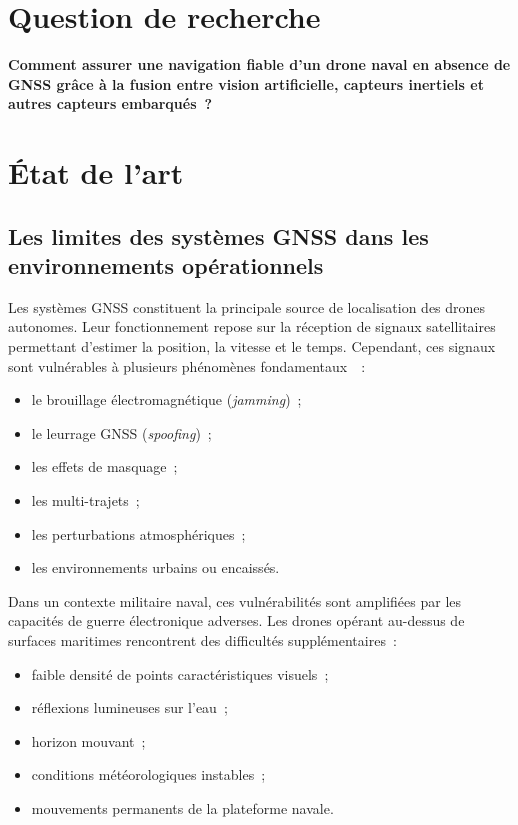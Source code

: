 \documentclass[12pt, a4paper, twoside, openright]{report}
\begin{document}
\section{Question de recherche}

\begin{mdframed}[backgroundcolor=blue!5, linewidth=1.5pt, linecolor=blue]
\textbf{Comment assurer une navigation fiable d'un drone naval en absence de GNSS grâce à la fusion entre vision artificielle, capteurs inertiels et autres capteurs embarqués~?}
\end{mdframed}

\section{État de l'art}

\subsection{Les limites des systèmes GNSS dans les environnements opérationnels}

Les systèmes GNSS constituent la principale source de localisation des drones autonomes. Leur fonctionnement repose sur la réception de signaux satellitaires permettant d'estimer la position, la vitesse et le temps. Cependant, ces signaux sont vulnérables à plusieurs phénomènes fondamentaux~\cite{mostafa2016gnss}~:

\begin{itemize}
    \item le brouillage électromagnétique (\textit{jamming})~;
    \item le leurrage GNSS (\textit{spoofing})~;
    \item les effets de masquage~;
    \item les multi-trajets~;
    \item les perturbations atmosphériques~;
    \item les environnements urbains ou encaissés.
\end{itemize}

Dans un contexte militaire naval, ces vulnérabilités sont amplifiées par les capacités de guerre électronique adverses. Les drones opérant au-dessus de surfaces maritimes rencontrent des difficultés supplémentaires~:

\begin{itemize}
    \item faible densité de points caractéristiques visuels~;
    \item réflexions lumineuses sur l'eau~;
    \item horizon mouvant~;
    \item conditions météorologiques instables~;
    \item mouvements permanents de la plateforme navale.
\end{itemize}
\end{document}
